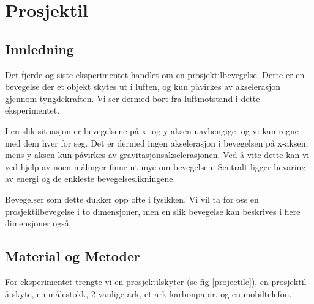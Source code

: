 \section{Prosjektil}

\subsection{Innledning}

Det fjerde og siste eksperimentet handlet om en prosjektilbevegelse. Dette er en bevegelse der et objekt skytes ut i luften, og kun påvirkes av akselerasjon gjennom tyngdekraften. Vi ser dermed bort fra luftmotstand i dette eksperimentet.

I en slik situasjon er bevegelsene på x- og y-aksen uavhengige, og vi kan regne med dem hver for seg. Det er dermed ingen akselerasjon i bevegelsen på x-aksen, mens y-aksen kun påvirkes av gravitasjonsakselerasjonen. Ved å vite dette kan vi ved hjelp av noen målinger finne ut mye om bevegelsen. Sentralt ligger bevaring av energi og de enkleste bevegelseslikningene.

Bevegelser som dette dukker opp ofte i fysikken. Vi vil ta for oss en prosjektilbevegelse i to dimensjoner, men en slik bevegelse kan beskrives i flere dimensjoner også

\subsection{Material og Metoder}

For eksperimentet trengte vi en prosjektilskyter (se fig \ref{projectile}), en prosjektil å skyte, en målestokk, 2 vanlige ark, et ark karbonpapir, og en mobiltelefon.

